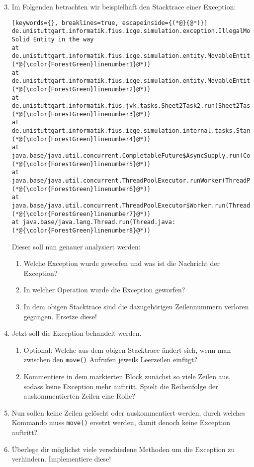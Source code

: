 \begin{enumerate}[label=\alph*)] \setcounter{enumi}{2}
    \item Im Folgenden betrachten wir beispielhaft den Stacktrace einer Exception:
    \begin{lstlisting}[keywords={}, breaklines=true, escapeinside={(*@}{@*)}]
de.unistuttgart.informatik.fius.icge.simulation.exception.IllegalMoveException: Solid Entity in the way
at de.unistuttgart.informatik.fius.icge.simulation.entity.MovableEntity.internalMove(MovableEntity.java:(*@{\color{ForestGreen}linenumber1}@*))
at de.unistuttgart.informatik.fius.icge.simulation.entity.MovableEntity.move(MovableEntity.java:(*@{\color{ForestGreen}linenumber2}@*))
at de.unistuttgart.informatik.fius.jvk.tasks.Sheet2Task2.run(Sheet2Task2.java:(*@{\color{ForestGreen}linenumber3}@*))
at de.unistuttgart.informatik.fius.icge.simulation.internal.tasks.StandardTaskRunner.executeTask(StandardTaskRunner.java:(*@{\color{ForestGreen}linenumber4}@*))
at java.base/java.util.concurrent.CompletableFuture$AsyncSupply.run(CompletableFuture.java:(*@{\color{ForestGreen}linenumber5}@*))
at java.base/java.util.concurrent.ThreadPoolExecutor.runWorker(ThreadPoolExecutor.java:(*@{\color{ForestGreen}linenumber6}@*))
at java.base/java.util.concurrent.ThreadPoolExecutor$Worker.run(ThreadPoolExecutor.java:(*@{\color{ForestGreen}linenumber7}@*))
at java.base/java.lang.Thread.run(Thread.java:(*@{\color{ForestGreen}linenumber8}@*))
    \end{lstlisting}
    Dieser soll nun genauer analysiert werden:
    \begin{enumerate}
        \item[i)] Welche Exception wurde geworfen und was ist die Nachricht der Exception?
        \item[ii)] In welcher Operation wurde die Exception geworfen?
        \item[iii)] In dem obigen Stacktrace sind die dazugehörigen Zeilennummern verloren gegangen. Ersetze diese!  
    \end{enumerate}
    \item Jetzt soll die Exception behandelt werden.
    \begin{enumerate}
        \item[i)] Optional: Welche  aus dem obigen Stacktrace ändert sich, wenn man zwischen den \lstinline{move()} Aufrufen jeweils
        Leerzeilen einfügt?  
        \item[ii)] Kommentiere in dem markierten Block zunächst so viele Zeilen aus, sodass keine Exception mehr auftritt. 
        Spielt die Reihenfolge der auskommentierten Zeilen eine Rolle?
    \end{enumerate}
    \item  Nun sollen keine Zeilen gelöscht oder auskommentiert werden, durch welches Kommando muss \lstinline{move()} ersetzt werden, damit 
    denoch keine Exception auftritt?
    \item Überlege dir möglichst viele verschiedene Methoden um die Exception zu verhindern. Implementiere diese!
\end{enumerate}
 
